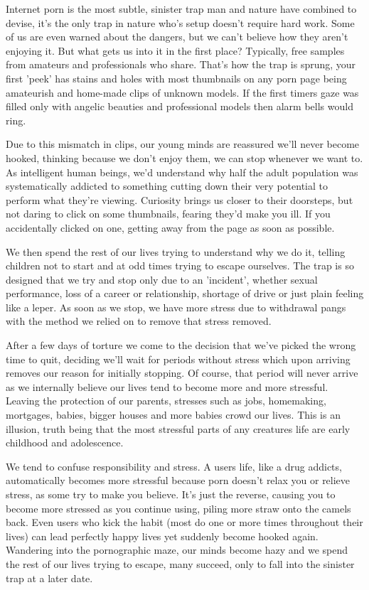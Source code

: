 \documentclass[easypeasy.tex]{subfiles}
\begin{document}
Internet porn is the most subtle, sinister trap man and nature have combined to devise, it's the only trap in nature who's setup doesn't require hard work. Some of us are even warned about the dangers, but we can't believe how they aren't enjoying it. But what gets us into it in the first place? Typically, free samples from amateurs and professionals who share. That's how the trap is sprung, your first 'peek' has stains and holes with most thumbnails on any porn page being amateurish and home-made clips of unknown models. If the first timers gaze was filled only with angelic beauties and professional models then alarm bells would ring.

Due to this mismatch in clips, our young minds are reassured we'll never become hooked, thinking because we don't enjoy them, we can stop whenever we want to. As intelligent human beings, we'd understand why half the adult population was systematically addicted to something cutting down their very potential to perform what they're viewing. Curiosity brings us closer to their doorsteps, but not daring to click on some thumbnails, fearing they'd make you ill. If you accidentally clicked on one, getting away from the page as soon as possible.

We then spend the rest of our lives trying to understand why we do it, telling children not to start and at odd times trying to escape ourselves. The trap is so designed that we try and stop only due to an 'incident', whether sexual performance, loss of a career or relationship, shortage of drive or just plain feeling like a leper. As soon as we stop, we have more stress due to withdrawal pangs with the method we relied on to remove that stress removed.

After a few days of torture we come to the decision that we've picked the wrong time to quit, deciding we'll wait for periods without stress which upon arriving removes our reason for initially stopping. Of course, that period will never arrive as we internally believe our lives tend to become more and more stressful. Leaving the protection of our parents, stresses such as jobs, homemaking, mortgages, babies, bigger houses and more babies crowd our lives. This is an illusion, truth being that the most stressful parts of any creatures life are early childhood and adolescence.

We tend to confuse responsibility and stress. A users life, like a drug addicts, automatically becomes more stressful because porn doesn't relax you or relieve stress, as some try to make you believe. It's just the reverse, causing you to become more stressed as you continue using, piling more straw onto the camels back. Even users who kick the habit (most do one or more times throughout their lives) can lead perfectly happy lives yet suddenly become hooked again. Wandering into the pornographic maze, our minds become hazy and we spend the rest of our lives trying to escape, many succeed, only to fall into the sinister trap at a later date.
\end{document}
